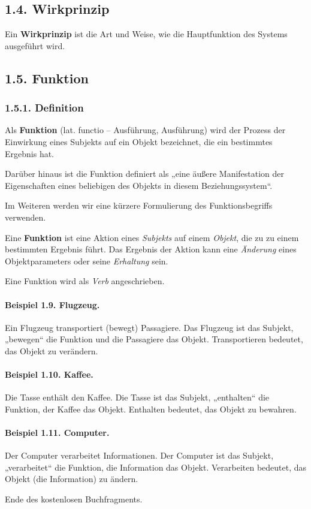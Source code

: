 \documentclass[11pt,a4paper]{article}
\begin{document}
\subsection*{1.4. Wirkprinzip}

Ein \textbf{Wirkprinzip} ist die Art und Weise, wie die Hauptfunktion des
Systems ausgeführt wird.

\subsection*{1.5. Funktion}
\subsubsection*{1.5.1. Definition}

Als \textbf{Funktion} (lat. functio -- Ausführung, Ausführung) wird der
Prozess der Einwirkung eines Subjekts auf ein Objekt bezeichnet, die ein
bestimmtes Ergebnis hat.

Darüber hinaus ist die Funktion definiert als „eine äußere Manifestation der
Eigenschaften eines beliebigen des Objekts in diesem Beziehungssystem“.

Im Weiteren werden wir eine kürzere Formulierung des Funktionsbegriffs
verwenden.

Eine \textbf{Funktion} ist eine Aktion eines \emph{Subjekts} auf einem
\emph{Objekt}, die zu zu einem bestimmten Ergebnis führt. Das Ergebnis der
Aktion kann eine \emph{Änderung} eines Objektparameters oder seine
\emph{Erhaltung} sein.

Eine Funktion wird als \emph{Verb} angeschrieben.

\paragraph{Beispiel 1.9. Flugzeug.}
Ein Flugzeug transportiert (bewegt) Passagiere. Das Flugzeug ist das Subjekt,
„bewegen“ die Funktion und die Passagiere das Objekt. Transportieren bedeutet,
das Objekt zu verändern.

\paragraph{Beispiel 1.10. Kaffee.}
Die Tasse enthält den Kaffee. Die Tasse ist das Subjekt, „enthalten“ die
Funktion, der Kaffee das Objekt. Enthalten bedeutet, das Objekt zu bewahren.

\paragraph{Beispiel 1.11. Computer.}
Der Computer verarbeitet Informationen. Der Computer ist das Subjekt,
„verarbeitet“ die Funktion, die Information das Objekt. Verarbeiten bedeutet,
das Objekt (die Information) zu ändern.

\begin{center}
  Ende des kostenlosen Buchfragments.
\end{center}
\end{document}
